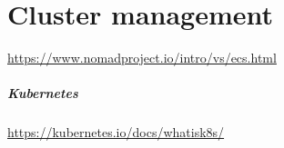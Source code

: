 \section{Cluster management}

\url{https://www.nomadproject.io/intro/vs/ecs.html}

\subparagraph{Kubernetes}

\url{https://kubernetes.io/docs/whatisk8s/}
